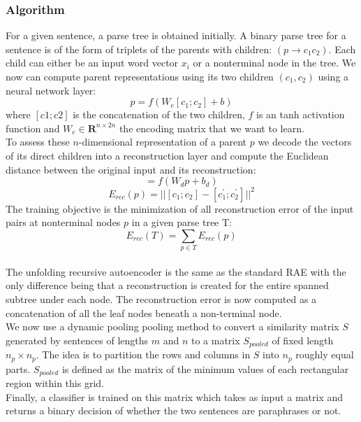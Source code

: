 \documentclass[conference]{IEEEtran}
\begin{document}
\subsubsection{Algorithm}
For a given sentence, a parse tree is obtained initially. A binary parse tree for a sentence is of the form of triplets of the parents with children: $(p \rightarrow c_1c_2)$. Each child can either be an input word vector $x_i$ or a nonterminal node in the tree. We now can compute parent representations using its two children $(c_1, c_2)$ using a neural network layer:\\
\begin{equation}
p = f(W_e[c_1;c_2] + b)
\end{equation}
where $[c1;c2]$ is the concatenation of the two children, $f$ is an tanh activation function and $W_e \in \mathbf{R}^{n \times 2n}$ the encoding matrix that we want to learn.\\
To assess these $n$-dimensional representation of a parent $p$ we decode the vectors of its direct children into a reconstruction layer and compute the Euclidean distance between the original input and its reconstruction:\\
\begin{equation}
[c^\prime_1;c^\prime_2] = f(W_dp + b_d)
\end{equation}
\begin{equation}
E_{rec}(p) = ||[c_1;c_2] - [c^\prime_1;c^\prime_2]||^2
\end{equation}
The training objective is the minimization of all reconstruction error of the input pairs at nonterminal nodes $p$ in a given parse tree T:\\
\begin{equation}
E_{rec}(T) = \sum_{p \in T} E_{rec}(p)
\end{equation}\\
The unfolding recursive autoencoder is the same as the standard RAE with the only difference being that a reconstruction is created for the entire spanned subtree under each node. The reconstruction error is now computed as a concatenation of all the leaf nodes beneath a non-terminal node.\\
We now use a dynamic pooling pooling method to convert a similarity matrix $S$ generated by sentences of lengths $m$ and $n$ to a matrix $S_{pooled}$ of fixed length $n_p \times n_p$. The idea is to partition the rows and columns in $S$ into $n_p$ roughly equal parts. $S_{pooled}$ is defined as the matrix of the minimum values of each rectangular region within this grid.\\
Finally, a classifier is trained on this matrix which takes as input a matrix and returns a binary decision of whether the two sentences are paraphrases or not.\\
\end{document}

